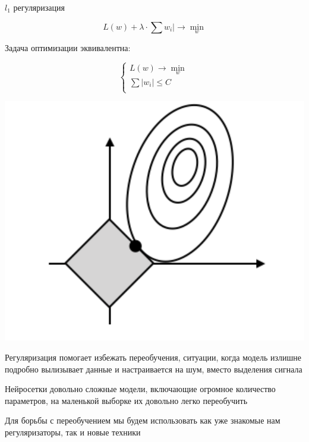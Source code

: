 \documentclass[notes,12pt, aspectratio=169]{beamer}
\newenvironment{wideitemize}{\itemize\addtolength{\itemsep}{10pt}}{\enditemize}
\begin{document}
\begin{frame}{$l_1$ регуляризация}

\[L(w) + \lambda \cdot  \sum w_i|  \to \min_{w}\]

Задача оптимизации эквивалентна:

\[
\begin{cases} 
L(w) \to \min_{w} \\
\sum |w_i| \le C \\
\end{cases}
\]

\begin{center}
	\includegraphics[width=0.35\paperwidth]{l1reg.png}
\end{center}
\end{frame}



\begin{frame} 
\begin{wideitemize}
	\item Регуляризация помогает избежать переобучения, ситуации, когда модель излишне подробно вылизывает данные и настраивается на шум, вместо выделения сигнала
	\item Нейросетки довольно сложные модели, включающие огромное количество параметров, на маленькой выборке их довольно легко переобучить 
	\item Для борьбы с переобучением мы будем использовать как уже знакомые нам регуляризаторы, так и новые техники
\end{wideitemize}
\end{frame}
\end{document}
